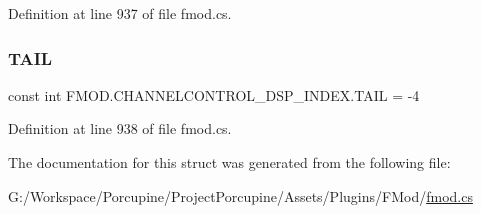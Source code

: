 Definition at line 937 of file fmod.\+cs.

\mbox{\label{struct_f_m_o_d_1_1_c_h_a_n_n_e_l_c_o_n_t_r_o_l___d_s_p___i_n_d_e_x_a8cea5de168421c47b68abaaccea3622e}} 
\subsubsection{\texorpdfstring{T\+A\+IL}{TAIL}}
{\footnotesize\ttfamily const int F\+M\+O\+D.\+C\+H\+A\+N\+N\+E\+L\+C\+O\+N\+T\+R\+O\+L\+\_\+\+D\+S\+P\+\_\+\+I\+N\+D\+E\+X.\+T\+A\+IL = -\/4}



Definition at line 938 of file fmod.\+cs.



The documentation for this struct was generated from the following file\+:\begin{DoxyCompactItemize}
\item 
G\+:/\+Workspace/\+Porcupine/\+Project\+Porcupine/\+Assets/\+Plugins/\+F\+Mod/\hyperlink{fmod_8cs}{fmod.\+cs}\end{DoxyCompactItemize}
